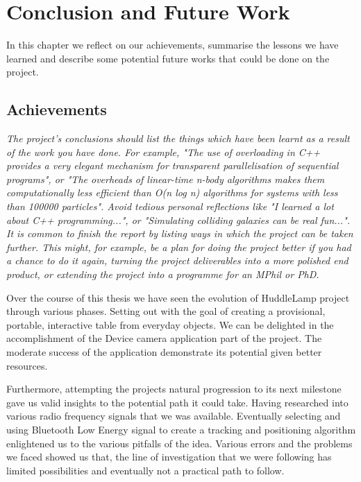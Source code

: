 
\chapter{Conclusion and Future Work}

\label{ch:conclusions}

In this chapter we reflect on our achievements, summarise the lessons we have learned and describe some potential future works that could be done on the project.

\section{Achievements}


\emph{The project's conclusions should list the things which have been learnt as a result of the work you have done. For example, "The use of overloading in C++ provides a very elegant mechanism for transparent parallelisation of sequential programs", or "The overheads of linear-time n-body algorithms makes them computationally less efficient than O(n log n) algorithms for systems with less than 100000 particles". Avoid tedious personal reflections like "I learned a lot about C++ programming...", or "Simulating colliding galaxies can be real fun...". It is common to finish the report by listing ways in which the project can be taken further. This might, for example, be a plan for doing the project better if you had a chance to do it again, turning the project deliverables into a more polished end product, or extending the project into a programme for an MPhil or PhD.}

Over the course of this thesis we have seen the evolution of HuddleLamp project through various phases. Setting out with the goal of creating a provisional, portable, interactive table from everyday objects. We can be delighted in the accomplishment of the Device camera application part of the project. The moderate success of the application demonstrate its potential given better resources.

Furthermore, attempting the projects natural progression to its next milestone gave us valid insights to the potential path it could take. Having researched into various radio frequency signals that we was available. Eventually selecting and using Bluetooth Low Energy signal to create a tracking and positioning algorithm enlightened us to the various pitfalls of the idea. Various errors and the problems we faced showed us that, the line of investigation that we were following has limited possibilities and eventually not a practical path to follow.

